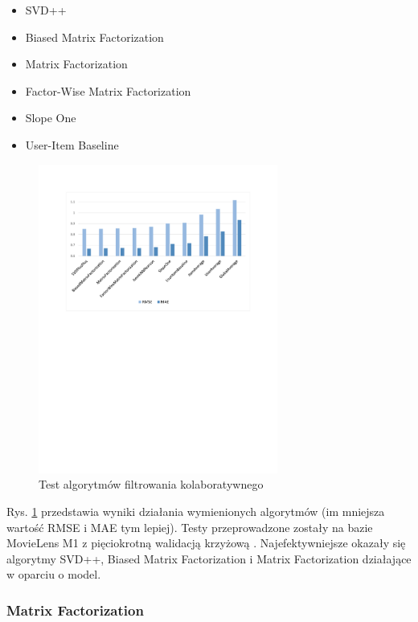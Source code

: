 \documentclass[twoside]{iisthesis}
\begin{document}
	 \begin{itemize}
	 	\item SVD++ \cite{koren2008factorization}
	 	\item Biased Matrix Factorization \cite{salakhutdinov2011probabilistic,rendle2008online}
	 	\item Matrix Factorization
	 	\item Factor-Wise Matrix Factorization \cite{bell2007modeling}
	 	\item Slope One \cite{lemire2005slope}
	 	\item User-Item Baseline \cite{koren2010factor}
	 \end{itemize}
	 
	 \begin{figure}[!ht] 
	 	\centering
	 	\includegraphics[width=0.7\textwidth]{cfcomparision}
	 	\caption{Test algorytmów filtrowania kolaboratywnego \protect\cite{mymedialitedatasets}}
	 	\label{fig:cfcomparision}
	 \end{figure}
	 
	 Rys. \ref{fig:cfcomparision} przedstawia wyniki działania wymienionych algorytmów (im mniejsza wartość RMSE i MAE tym lepiej). Testy przeprowadzone zostały na bazie MovieLens M1 z pięciokrotną walidacją krzyżową \cite{harper2016movielens}. Najefektywniejsze okazały się algorytmy SVD++, Biased Matrix Factorization i Matrix Factorization działające w oparciu o model.
	 
	 \subsubsection{Matrix Factorization}	
	 
\end{document}
